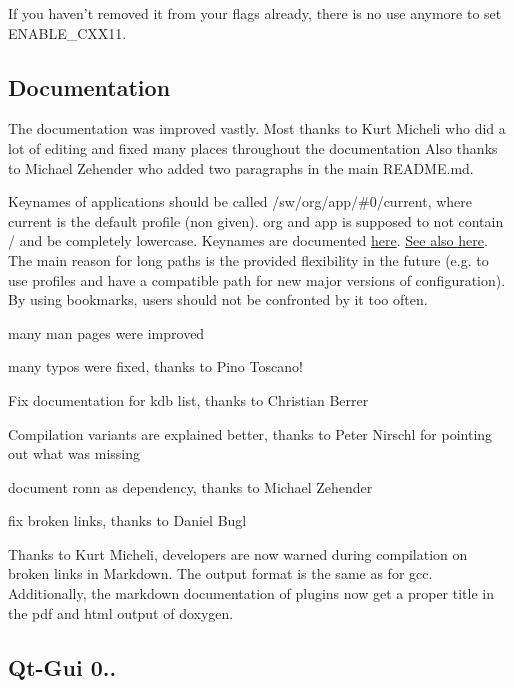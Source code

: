 If you haven't removed it from your flags already, there is no use anymore to set {\ttfamily E\+N\+A\+B\+L\+E\+\_\+\+C\+X\+X11}.

\subsection*{Documentation}

The documentation was improved vastly. Most thanks to Kurt Micheli who did a lot of editing and fixed many places throughout the documentation Also thanks to Michael Zehender who added two paragraphs in the main R\+E\+A\+D\+M\+E.\+md.

Keynames of applications should be called {\ttfamily /sw/org/app/\#0/current}, where {\ttfamily current} is the default profile (non given). {\ttfamily org} and {\ttfamily app} is supposed to not contain {\ttfamily /} and be completely lowercase. Keynames are documented \hyperlink{md_doc_help_elektra-key-names_doc_help_elektra-key-names_md}{here}. \hyperlink{doc_tutorials_application-integration_md}{See also here}. The main reason for long paths is the provided flexibility in the future (e.\+g. to use profiles and have a compatible path for new major versions of configuration). By using bookmarks, users should not be confronted by it too often.


\begin{DoxyItemize}
\item many man pages were improved
\item many typos were fixed, thanks to Pino Toscano!
\item Fix documentation for kdb list, thanks to Christian Berrer
\item Compilation variants are explained better, thanks to Peter Nirschl for pointing out what was missing
\item document ronn as dependency, thanks to Michael Zehender
\item fix broken links, thanks to Daniel Bugl
\end{DoxyItemize}

Thanks to Kurt Micheli, developers are now warned during compilation on broken links in Markdown. The output format is the same as for gcc. Additionally, the markdown documentation of plugins now get a proper title in the pdf and html output of doxygen.

\subsection*{Qt-\/\+Gui 0..}

